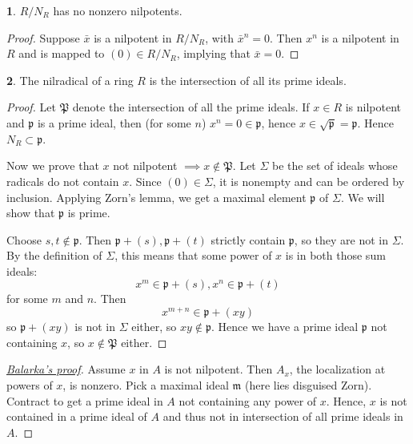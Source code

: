\documentclass{book}
\newcommand{\fr}[1]{\mathfrak #1}
\theoremstyle{definition}
\theoremstyle{block}
\newtheorem{block}{}[section]
\theoremstyle{thm}
\begin{document}
\begin{block}
  $R/N_R$ has no nonzero nilpotents.
\end{block}
\begin{proof}
  Suppose $\bar x$ is a nilpotent in $R/N_R$, with ${\bar x}^n=0$. Then $x^n$ is
  a nilpotent in $R$ and is mapped to $(0)\in R/N_R$, implying that $\bar x = 0$. 
\end{proof}

\begin{block}
  The nilradical of a ring $R$ is the intersection of all its prime ideals.
\end{block}
\begin{proof}
  Let $\fr P$ denote the intersection of all the prime ideals. If $x\in R$ is
  nilpotent and $\fr p$ is a prime ideal, then (for some $n$) $x^n = 0\in\fr p$,
  hence $x\in\sqrt{\fr p}=\fr p$. Hence $N_R\subset\fr p$.\par
  Now we prove that $x$ not nilpotent $\implies x\notin\fr P$. Let $\Sigma$ be
  the set of ideals whose radicals do not contain $x$. Since $(0)\in\Sigma$, it
  is nonempty and can be ordered by inclusion. Applying Zorn's lemma, we get a
  maximal element $\fr p$ of $\Sigma$. We will show that $\fr p$ is prime.\par
  Choose $s,t\notin\fr p$. Then $\fr p + (s), \fr p + (t)$ strictly contain $\fr
  p$, so they are not in $\Sigma$. By the definition of $\Sigma$, this means
  that some power of $x$ is in both those sum ideals:
  \[x^m\in\fr p + (s), x^n\in\fr p + (t)\]
  for some $m$ and $n$. Then
  \[x^{m+n}\in \fr p + (xy)\]
  so $\fr p + (xy)$ is not in $\Sigma$ either, so $xy\notin\fr p$. Hence we have
  a prime ideal $\fr p$ not containing $x$, so $x\notin\fr P$ either.
\end{proof}

\begin{proof}[\href{http://chat.stackexchange.com/transcript/message/24368544\#24368544}{Balarka's
  proof}] 
  Assume $x$ in $A$ is not nilpotent. Then $A_x$, the localization at powers of
  $x$, is nonzero. Pick a maximal ideal $\mathfrak{m}$ (here lies disguised
  Zorn). Contract to get a prime ideal in $A$ not containing any power of $x$.
  Hence, $x$ is not contained in a prime ideal of $A$ and thus not in intersection
  of all prime ideals in $A$.
\end{proof}
\end{document}
